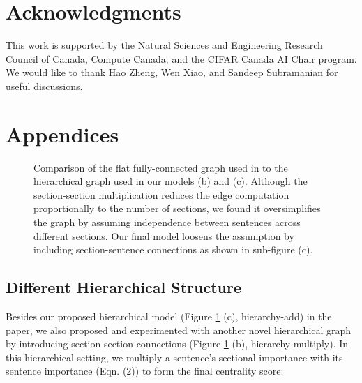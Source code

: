 \documentclass[11pt,a4paper]{article}
\begin{document}
\section*{Acknowledgments}
This work is supported by the Natural Sciences and Engineering Research Council of Canada, Compute Canada, and the CIFAR Canada AI Chair program. We would like to thank Hao Zheng, Wen  Xiao, and Sandeep Subramanian for useful discussions. 




\clearpage
\newpage
\appendix
\section{Appendices}
\label{sec:appendix}
\begin{figure}[hbt!]
  \centering
    \hfill
   \hfill
  \centering
\caption{\small Comparison of the flat fully-connected graph used in \citet{erkan2004lexrank,mihalcea2004textrank,zheng2019sentence} to the 
hierarchical graph used in our models (b) and (c). Although the section-section multiplication reduces the edge computation proportionally to the number of sections, we found it oversimplifies the graph by assuming independence between sentences across different sections. Our final model loosens the assumption by including section-sentence connections as shown in sub-figure (c). }
\label{fig:three_hierarchy}
\end{figure}


\subsection{Different Hierarchical Structure}    
Besides our proposed hierarchical model (Figure \ref{fig:three_hierarchy} (c), hierarchy-add) in the paper, we also proposed and experimented with another novel hierarchical graph by introducing section-section  connections (Figure \ref{fig:three_hierarchy} (b), hierarchy-multiply). In this hierarchical setting, we multiply a sentence's sectional importance with its sentence importance (Eqn. (2)) to form the final centrality score:  
\end{document}
